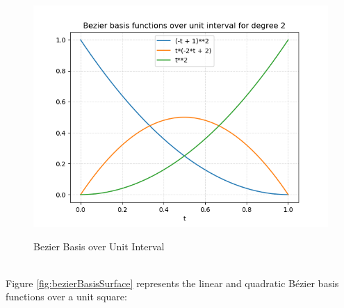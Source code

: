 \documentclass[a4paper, 11pt]{article}
\begin{document}
\begin{enumerate}
\begin{enumerate}[label=\alph*.]
\begin{figure}[ht]
{    \includegraphics[scale=0.5]{resources/bezierBasisFunctionCurve2.png} \label{fig:bezierBasisCurve2} 
  } 
  \caption{Bezier Basis over Unit Interval} 
  \centering
  \label{fig:bezierBasisCurve}
\end{figure} \\
Figure \ref{fig:bezierBasisSurface} represents the linear and quadratic B\'{e}zier basis functions over a unit square: 
\begin{figure}[ht] 
 \quad 
\end{figure}
\end{enumerate}
\end{enumerate}
\end{document}
